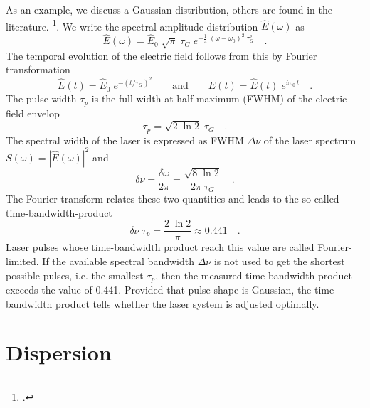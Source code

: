 As an example, we discuss a Gaussian distribution, others are found in the literature. \footcite{DielsRudolph1996,Rulliere2005}.
We write the spectral amplitude distribution $\hat{E}(\omega)$ as
\begin{equation}
  \hat{E}(\omega) = \hat{E}_0 \; \sqrt{\pi} \; \tau_G \; e^{-
  \frac{1}{4} \; (\omega - \omega_0)^2 \; \tau_G^2} \quad .
\end{equation}
The temporal evolution of the electric field follows from this by
Fourier transformation
\begin{equation}
  \hat {E}(t) = \hat{E}_0 \; e^{- ( t / \tau_G ) ^2}
  \qquad\text{and}\qquad E(t) = \hat{E}(t)\; e^{i \omega_0 \, t} \quad .
\end{equation}
The pulse width $\tau_p$ is the full width at half maximum (FWHM) of the electric field envelop
\begin{equation}
  \tau_p = \sqrt{2 \; \ln 2} \; \tau_G \quad.
\end{equation}
The spectral width of the laser is expressed as FWHM $\Delta
\nu$ of the laser spectrum $S(\omega) =
|\hat{E}(\omega)|^2$ and
\begin{equation}
  \delta \nu = \frac{\delta \omega}{2 \pi} = \frac{\sqrt{8 \; \ln
  2}}{2 \pi \; \tau_G} \quad.
\end{equation}
The Fourier transform relates these two quantities and leads to the so-called time-bandwidth-product
\begin{equation}
  \delta \nu \; \tau_p = \frac{2 \; \ln 2}{\pi} \approx 0.441 \quad .
\end{equation}
Laser pulses whose time-bandwidth product reach this value
are called Fourier-limited. If the available
 spectral bandwidth $\Delta \nu$ is not used
to get the shortest possible pulses, i.e. the smallest $\tau_p$,
then the measured time-bandwidth product exceeds the
value of 0.441. Provided that pulse shape is Gaussian, the time-bandwidth product tells whether the 
laser system is adjusted optimally.

\section{Dispersion}

